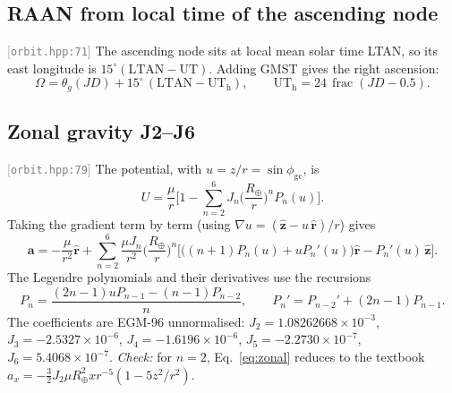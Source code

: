\documentclass[11pt,a4paper]{article}
\newcommand{\vb}[1]{\boldsymbol{#1}}
\newcommand{\uv}[1]{\hat{\boldsymbol{#1}}}
\newcommand{\src}[1]{\textcolor{gray}{\small[\texttt{#1}]}}
\begin{document}
\subsection{RAAN from local time of the ascending node} \src{orbit.hpp:71}
The ascending node sits at local mean solar time LTAN, so its east longitude is $15^\circ(\text{LTAN} - \text{UT})$. Adding GMST gives the right ascension:
\begin{equation}
\Omega = \theta_g(JD) + 15^\circ\,(\text{LTAN} - \text{UT}_{\text{h}}),\qquad \text{UT}_{\text{h}} = 24\,\operatorname{frac}(JD - 0.5).
\end{equation}

\subsection{Zonal gravity J2--J6} \src{orbit.hpp:79}
The potential, with $u = z/r = \sin\phi_{\text{gc}}$, is
\begin{equation}
U = \frac{\mu}{r}\Big[1 - \sum_{n=2}^{6} J_n\Big(\frac{R_\oplus}{r}\Big)^{n} P_n(u)\Big].
\end{equation}
Taking the gradient term by term (using $\nabla u = (\uv z - u\,\uv r)/r$) gives
\begin{equation}
\vb a = -\frac{\mu}{r^2}\uv r + \sum_{n=2}^{6}\frac{\mu J_n}{r^2}\Big(\frac{R_\oplus}{r}\Big)^{n}\Big[\big((n+1)P_n(u) + u P_n'(u)\big)\uv r - P_n'(u)\,\uv z\Big].
\label{eq:zonal}
\end{equation}
The Legendre polynomials and their derivatives use the recursions
\begin{equation}
P_n = \frac{(2n-1)uP_{n-1} - (n-1)P_{n-2}}{n},\qquad P_n' = P_{n-2}' + (2n-1)P_{n-1}.
\end{equation}
The coefficients are EGM-96 unnormalised: $J_2 = 1.08262668\times10^{-3}$, $J_3 = -2.5327\times10^{-6}$, $J_4 = -1.6196\times10^{-6}$, $J_5 = -2.2730\times10^{-7}$, $J_6 = 5.4068\times10^{-7}$.
\emph{Check:} for $n=2$, Eq.~\eqref{eq:zonal} reduces to the textbook $a_x = -\tfrac32 J_2\mu R_\oplus^2 x r^{-5}(1-5z^2/r^2)$.
\end{document}
